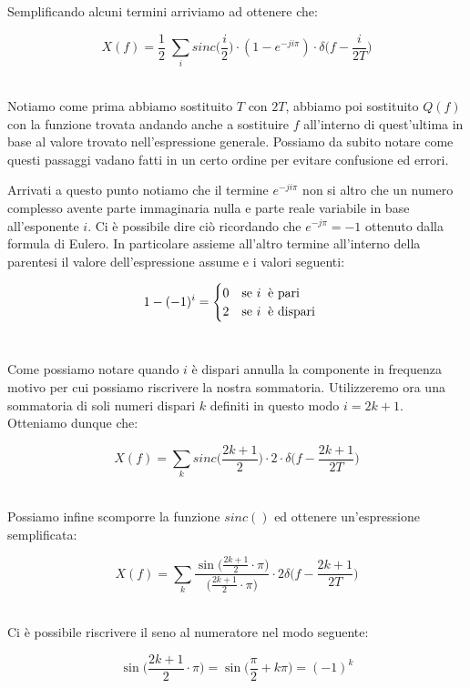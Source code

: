 \documentclass[../main.tex]{subfiles}
\begin{document}
Semplificando alcuni termini arriviamo ad ottenere che:

\[ X(f) = \frac{1}{2} \; \sum_i \unit{sinc}\bigg(\frac{i}{2}\bigg) \cdot (1 - e^{-j i \pi }) \cdot \delta\bigg(f - \frac{i}{2T}\bigg)  \]\

Notiamo come prima abbiamo sostituito $T$ con $2T$, abbiamo poi sostituito $Q(f)$ con la funzione trovata andando anche a sostituire $f$ all'interno di quest'ultima in base al valore trovato nell'espressione generale. Possiamo da subito notare come questi passaggi vadano fatti in un certo ordine per evitare confusione ed errori.

Arrivati a questo punto notiamo che il termine $e^{-ji \pi}$ non si altro che un numero complesso avente parte immaginaria nulla e parte reale variabile in base all'esponente $i$. Ci è possibile dire ciò ricordando che $e^{-j\pi} = -1$ ottenuto dalla formula di Eulero.
In particolare assieme all'altro termine all'interno della parentesi il valore dell'espressione assume e i valori seguenti:


\[ 1 - (-1)^i = \begin{cases}

0 \hspace{10pt} $se $ i\;\;$è pari$\\
2 \hspace{10pt} $se $ i\;\;$è dispari$\\
	
\end{cases} \]\

Come possiamo notare quando $i$ è dispari annulla la componente in frequenza motivo per cui possiamo riscrivere la nostra sommatoria. Utilizzeremo ora una sommatoria di soli numeri dispari $k$ definiti in questo modo $i = 2k + 1$.
Otteniamo dunque che:

\[ X(f) = \sum_k \unit{sinc}\bigg(\frac{2k + 1}{2}\bigg) \cdot 2 \cdot \delta\bigg( f - \frac{2k + 1}{2T}\bigg) \]\

Possiamo infine scomporre la funzione $sinc()$ ed ottenere un'espressione semplificata:

\[ X(f) = \sum_k \frac{\sin\big( \frac{2k+1}{2} \cdot \pi\big) }{ \big(\frac{2k + 1}{2} \cdot \pi\big)}  \cdot 2\delta \bigg( f - \frac{2k + 1}{2T}\bigg)  \]\

Ci è possibile riscrivere il seno al numeratore nel modo seguente:

\[  \sin\bigg( \frac{2k+1}{2} \cdot \pi\bigg) =  \sin\big( \frac{\pi}{2} + k\pi  \big) = (-1)^k \]\
\end{document}

